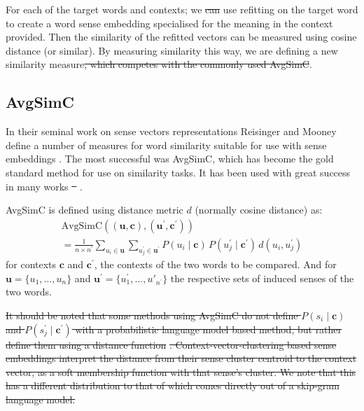 \documentclass{article} %
\def\parencite{\cite} %
\renewcommand{\c}{\mathbf{c}}
\renewcommand{\u}{\mathbf{u}}
\providecommand{\DIFadd}[1]{{\protect\color{blue}\uwave{#1}}} %
\providecommand{\DIFdel}[1]{{\protect\color{red}\sout{#1}}}                      %
\providecommand{\DIFaddbegin}{} %
\providecommand{\DIFaddend}{} %
\providecommand{\DIFdelbegin}{} %
\providecommand{\DIFdelend}{} %
\begin{document}
For each of the target words and contexts; we \DIFdelbegin \DIFdel{can }\DIFdelend use refitting on the target word to create a word sense embedding specialised for the meaning in the context provided. Then the similarity of the refitted vectors can be measured using cosine distance (or similar).
By measuring similarity this way, we are defining a new similarity measure\DIFdelbegin \DIFdel{, which competes with the commonly used AvgSimC}\DIFdelend .

\subsection{AvgSimC}
In their seminal work on sense vectors representations Reisinger and Mooney define a number of measures for word similarity suitable for use with sense embeddings \parencite{Reisinger2010}. The most successful was AvgSimC, which has become the gold standard method for use on similarity tasks. It has been used with great success in many works \DIFdelbegin \DIFdel{\mbox{%
\cite{Huang2012, Chen2014, tian2014probabilistic}}%
}\DIFdelend \DIFaddbegin \DIFadd{\mbox{%
\cite{Huang2012,Chen2014,tian2014probabilistic}}%
}\DIFaddend . 


AvgSimC is defined using distance metric $d$ (normally cosine distance) as: 
\begin{multline} \label{eq:avgsimc}
\mathrm{AvgSimC}((\u,\c),(\u^{\prime},\c^{\prime})) \\
=  \frac{1}{n \times n^{\prime}}
\sum_{u_{i}\in\u}
\sum_{u_{j}^{\prime}\in\u^{\prime}}
P(u_{i}\mid\c)\,P(u_{j}^{\prime}\mid\c^{\prime})\,d(u_{i},u_{j}^{\prime})
\end{multline}
for contexts $\c$ and $\c^\prime$, the contexts of the two words to be compared.
And for $\u=\{u_1,...,u_n\}$ and $\u^\prime=\{u^\prime_1,...,u\prime_{n^\prime}\}$ the respective sets of induced senses of the two words.


\DIFdelbegin \DIFdel{It should be noted that some methods using AvgSimC  do not define  $P(s_{i}\mid\c)$ and $P(s_{j}^{\prime}\mid\c^\prime)$ with a probabilistic language model based method, but rather define them using a distance function }%
\DIFdel{. Context-vector-clustering based sense embeddings interpret the distance from their sense cluster centroid to the context vector, as a soft membership function with that sense's cluster. We note that this has a different distribution to that of which comes directly out of a skip-gram language model.
}%
\end{document}
